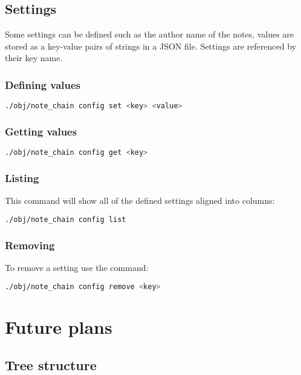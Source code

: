 \documentclass[12pt,a4paper]{article}
\begin{document}
\subsection{Settings}
Some settings can be defined such as the author name of the notes, values are
stored as a key-value pairs of strings in a JSON file. Settings are referenced
by their key name.

\subsubsection{Defining values}

\begin{lstlisting}[language=bash]
  ./obj/note_chain config set <key> <value>
\end{lstlisting}

\subsubsection{Getting values}

\begin{lstlisting}[language=bash]
  ./obj/note_chain config get <key>
\end{lstlisting}

\subsubsection{Listing}
This command will show all of the defined settings aligned into columns:

\begin{lstlisting}[language=bash]
  ./obj/note_chain config list
\end{lstlisting}

\subsubsection{Removing}
To remove a setting use the command:
\begin{lstlisting}[language=bash]
  ./obj/note_chain config remove <key>
\end{lstlisting}

\section{Future plans}
\subsection{Tree structure}
\end{document}
